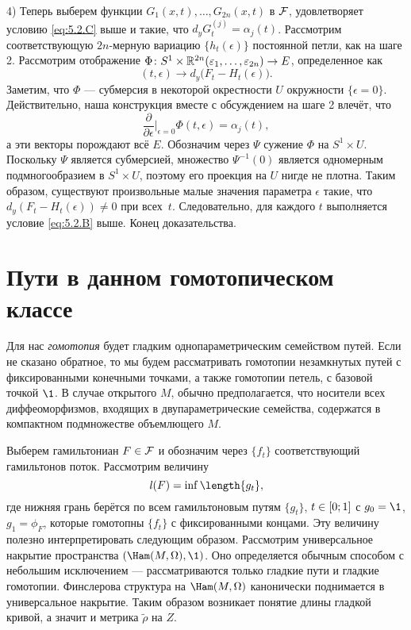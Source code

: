 4) Теперь выберем функции $G_1(x,t),\dots, G_{2n}(x,t)$ в $\mathcal{F}$, удовлетворяет условию \ref{eq:5.2.C} выше и такие, что $d_y G_t^{(j)} = \alpha_j (t)$.
Рассмотрим соответствующую $2n$-мерную вариацию $\{h_t (\epsilon)\}$ постоянной петли, как на шаге 2.
Рассмотрим отображение $\Phi\colon S^1 \times \mathbb{R}^{2n} (\varepsilon_1 ,\dots, \varepsilon_{2n}) \to E$, определенное как 
\[(t, \epsilon) \to d_y \big(F_t - H_t (\epsilon)\big).\]
Заметим, что $\Phi$ --- субмерсия в некоторой окрестности $U$ окружности $\{\epsilon = 0\}$.
Действительно, наша конструкция вместе с обсуждением на шаге 2 влечёт, что 
\[\frac{\partial}{\partial\epsilon}|_{\epsilon = 0} \Phi (t, \epsilon) = \alpha_j (t),\]
а эти векторы порождают всё $E$.
Обозначим через $\Psi$ сужение $\Phi$ на $S^1 \times U$.
Поскольку $\Psi$ является субмерсией, множество $\Psi^{-1} (0)$ является одномерным подмногообразием в $S^1 \times U$, поэтому его проекция на $U$ нигде не плотна.
Таким образом, существуют произвольные малые значения параметра $\epsilon$ такие, что $d_y (F_t - H_t (\epsilon)) \ne 0$ при всех~$t$.
Следовательно, для каждого $t$ выполняется условие \ref{eq:5.2.B} выше.
Конец доказательства.
\qeds

\section{Пути в данном гомотопическом классе}\label{5.3}

Для нас \emph{гомотопия} будет гладким однопараметрическим семейством путей.
Если не сказано обратное, то мы будем рассматривать гомотопии незамкнутых путей с фиксированными конечными точками, а также гомотопии петель, с базовой точкой $\1$.
В случае открытого $M$, обычно предполагается, что носители всех диффеоморфизмов, входящих в двупараметрические семейства, содержатся в компактном подмножестве объемлющего $M$.

Выберем гамильтониан $F \in \mathcal{F}$ и обозначим через $\{f_t\}$ соответствующий гамильтонов поток.
Рассмотрим величину \[\l(F) = \inf \length \{g_t\},\] где нижняя грань берётся по всем гамильтоновым путям $\{g_t\}$, $t \z\in [0; 1]$ с $g_0 = \1$, $g_1 = \phi_F$, которые гомотопны $\{f_t\}$ с фиксированными концами.
Эту величину полезно интерпретировать следующим образом.
Рассмотрим универсальное накрытие  пространства $(\Ham (M, \Omega), \1)$.
Оно определяется обычным способом с небольшим исключением --- рассматриваются только гладкие пути и гладкие гомотопии.
Финслерова структура на $\Ham (M, \Omega)$ канонически поднимается в универсальное накрытие.
Таким образом возникает понятие длины гладкой кривой, а значит и метрика $\tilde\rho$ на $Z$.

